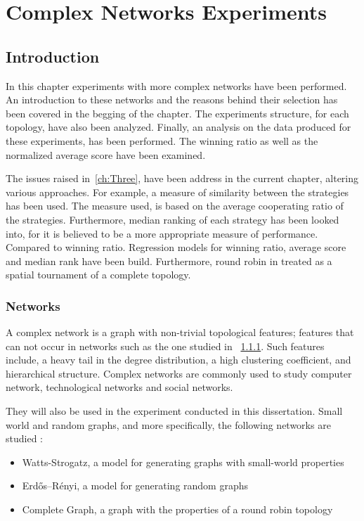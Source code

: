 \chapter{Complex Networks Experiments}
\label{chap:Four}

\section{Introduction}
In this chapter experiments with more complex networks have been performed.
An introduction to these networks and the reasons behind their selection has been
covered in the begging of the chapter. The experiments structure, for each topology,
have also been analyzed. Finally, an analysis on the data produced for these
experiments, has been performed. The winning ratio as well as the normalized
average score have been examined.

The issues raised in~\ref{ch:Three}, have been address in the current chapter,
altering various approaches. For example, a measure of similarity between the
strategies has been used. The measure used, is based on the average cooperating
ratio of the strategies. Furthermore, median ranking of each strategy has been
looked into, for it is believed to be a more appropriate measure of performance.
Compared to winning ratio. Regression models for winning ratio, average score
and median rank have been build. Furthermore, round robin in treated as
a spatial tournament of a complete topology.

\subsection{Networks}

A complex network is a graph with non-trivial topological features;
features that can not occur in networks such as the one studied in ~\ref{}.
Such features include, a heavy tail in the degree distribution, a high
clustering coefficient, and hierarchical structure. Complex networks are commonly
used to study computer network, technological networks and social networks.

They will also be used in the experiment conducted in this dissertation. Small
world and random graphs, and more specifically, the following networks are
studied :

\begin{itemize}
  \item Watts-Strogatz, a model for generating graphs with small-world properties
  \item Erdős–Rényi, a model for generating random graphs
  \item Complete Graph, a graph with the properties of a round robin topology
\end{itemize}

